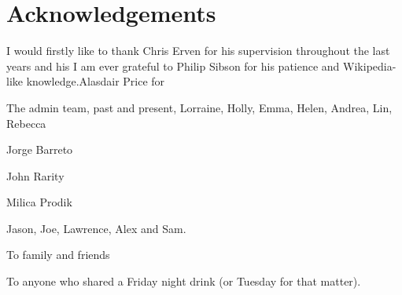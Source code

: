 %
%

\chapter*{Acknowledgements}
\begin{SingleSpace}
I would firstly like to thank Chris Erven for his supervision throughout the last years and his  I am ever grateful to Philip Sibson for his patience and Wikipedia-like knowledge.Alasdair Price for 

The admin team, past and present, Lorraine, Holly, Emma, Helen, Andrea, Lin, Rebecca

Jorge Barreto

John Rarity

Milica Prodik 

Jason, Joe, Lawrence, Alex and Sam. 

To family and friends

To anyone who shared a Friday night drink (or Tuesday for that matter).

\end{SingleSpace}
\clearpage